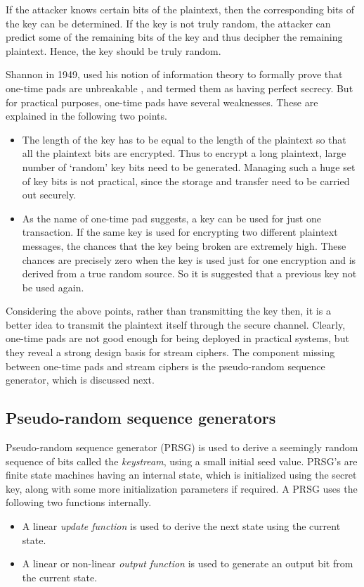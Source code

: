 If the attacker knows certain bits of the plaintext, then the corresponding bits of the key can be determined. If the key is not truly random, the attacker can predict some of the remaining bits of the key and thus decipher the remaining plaintext. Hence, the key should be truly random. 

Shannon in 1949, used his notion of information theory to formally prove that one-time pads are unbreakable \cite{shannon1949cts}, and termed them as having perfect secrecy. But for practical purposes, one-time pads have several weaknesses. These are explained in the following two points.
\begin{itemize}
\item The length of the key has to be equal to the length of the plaintext so that all the plaintext bits are encrypted. Thus to encrypt a long plaintext, large number of `random' key bits need to be generated. Managing such a huge set of key bits is not practical, since the storage and transfer need to be carried out securely. 

\item As the name of one-time pad suggests, a key can be used for just one transaction. If the same key is used for encrypting two different plaintext messages, the chances that the key being broken are extremely high. These chances are precisely zero when the key is used just for one encryption and is derived from a true random source. So it is suggested that a previous key not be used again.
\end{itemize}

Considering the above points, rather than transmitting the key then, it is a better idea to transmit the plaintext itself through the secure channel. Clearly, one-time pads are not good enough for being deployed in practical systems, but they reveal a strong design basis for stream ciphers. The component missing between one-time pads and stream ciphers is the pseudo-random sequence generator, which is discussed next. 


\subsection{Pseudo-random sequence generators}
\label{sec:psrg}

Pseudo-random sequence generator (PRSG) is used to derive a seemingly random sequence of bits called the \emph{keystream}, using a small initial seed value. PRSG's are finite state machines having an internal state, which is initialized using the secret key, along with some more initialization parameters if required. A PRSG uses the following two functions internally.
\begin{itemize}
\item A linear \emph{update function} is used to derive the next state using the current state.
\item A linear or non-linear \emph{output function} is used to generate an output bit from the current state. 
\end{itemize}

